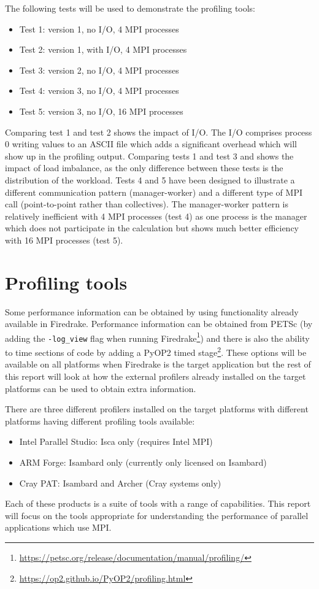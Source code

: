 \documentclass[a4paper,titlepage]{article}
\begin{document}
The following tests will be used to demonstrate the profiling tools:
\begin{itemize}
\item Test 1: version 1, no I/O, 4 MPI processes
\item Test 2: version 1, with I/O, 4 MPI processes
\item Test 3: version 2, no I/O, 4 MPI processes
\item Test 4: version 3, no I/O, 4 MPI processes
\item Test 5: version 3, no I/O, 16 MPI processes 
\end{itemize}
Comparing test 1 and test 2 shows the impact of I/O. The I/O comprises process 0 writing values to an ASCII file which adds a significant overhead which will show up in the profiling output. Comparing tests 1 and test 3 and shows the impact of load imbalance, as the only difference between these tests is the distribution of the workload. 
Tests 4 and 5 have been designed to illustrate a different communication pattern (manager-worker) and a different type of MPI call (point-to-point rather than collectives). 
The manager-worker pattern is relatively inefficient with 4 MPI processes (test 4) as one process is the manager which does not participate in the calculation but shows much better efficiency with 16 MPI processes (test 5). 


\section{Profiling tools}
\label{section:profiling_tools}

Some performance information can be obtained by using functionality already available in Firedrake. Performance information can be obtained from PETSc (by adding the \verb+-log_view+ flag when running Firedrake\footnote{\url{https://petsc.org/release/documentation/manual/profiling/}}) and there is also the ability to time sections of code by adding a PyOP2 timed stage\footnote{\url{https://op2.github.io/PyOP2/profiling.html}}. These options will be available on all platforms when Firedrake is the target application but the rest of this report will look at how the external profilers already installed on the target platforms can be used to obtain extra information. 

There are three different profilers installed on the target platforms with different platforms having different profiling tools available:
%
\begin{itemize}
\item Intel Parallel Studio: Isca only (requires Intel MPI)
\item ARM Forge: Isambard only (currently only licensed on Isambard)
\item Cray PAT: Isambard and Archer (Cray systems only)
\end{itemize}
%
Each of these products is a suite of tools with a range of capabilities. This report will focus on the tools appropriate for understanding the performance of parallel applications which use MPI.
\end{document}
